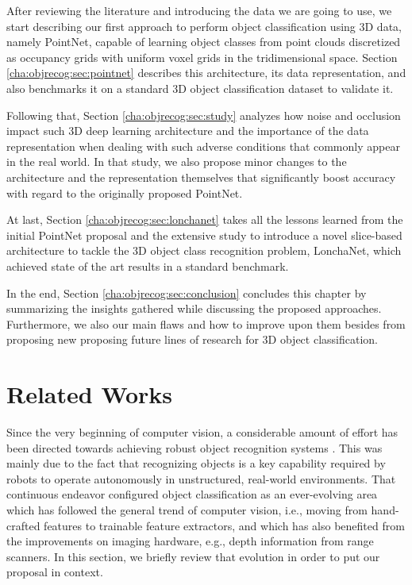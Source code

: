 After reviewing the literature and introducing the data we are going to use, we start describing our first approach to perform object classification using 3D data, namely PointNet, capable of learning object classes from point clouds discretized as occupancy grids with uniform voxel grids in the tridimensional space. Section \ref{cha:objrecog:sec:pointnet} describes this architecture, its data representation, and also benchmarks it on a standard 3D object classification dataset to validate it.

Following that, Section \ref{cha:objrecog:sec:study} analyzes how noise and occlusion impact such 3D deep learning architecture and the importance of the data representation when dealing with such adverse conditions that commonly appear in the real world. In that study, we also propose minor changes to the architecture and the representation themselves that significantly boost accuracy with regard to the originally proposed PointNet.

At last, Section \ref{cha:objrecog:sec:lonchanet} takes all the lessons learned from the initial PointNet proposal and the extensive study to introduce a novel slice-based architecture to tackle the 3D object class recognition problem, LonchaNet, which achieved state of the art results in a standard benchmark.

In the end, Section \ref{cha:objrecog:sec:conclusion} concludes this chapter by summarizing the insights gathered while discussing the proposed approaches. Furthermore, we also our main flaws and how to improve upon them besides from proposing new proposing future lines of research for 3D object classification.

\section{Related Works}
\label{cha:objrecog:sec:relatedworks}

Since the very beginning of computer vision, a considerable amount of effort has been directed towards achieving robust object recognition systems \cite{Andreopoulos2013}. This was mainly due to the fact that recognizing objects is a key capability required by robots to operate autonomously in unstructured, real-world environments. That continuous endeavor configured object classification as an ever-evolving area which has followed the general trend of computer vision, i.e., moving from hand-crafted features to trainable feature extractors, and which has also benefited from the improvements on imaging hardware, e.g., depth information from range scanners. In this section, we briefly review that evolution in order to put our proposal in context.

